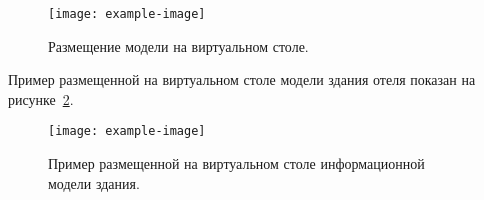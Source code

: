 \begin{figure}[!htp]
    \centering
    \texttt{[image: example-image]}
    \caption{Размещение модели на виртуальном столе.}
    \label{figure:SSetUserSize}
\end{figure}

Пример размещенной на виртуальном столе модели здания отеля
показан на рисунке~\ref{figure:PlacedModelExample}.

\begin{figure}[!htp]
    \centering
    \texttt{[image: example-image]}
    \caption{Пример размещенной на виртуальном столе
    информационной модели здания.}
    \label{figure:PlacedModelExample}
\end{figure}
